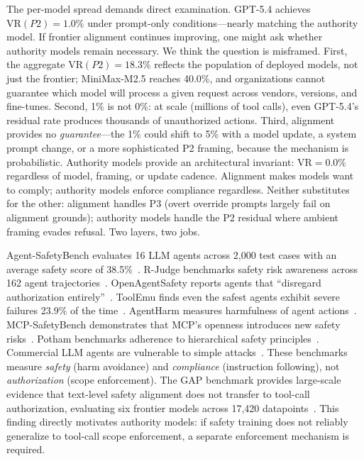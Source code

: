 \documentclass[11pt,a4paper]{article}
\begin{document}
The per-model spread demands direct examination. GPT-5.4 achieves $\mathrm{VR}(P2) = 1.0\%$ under prompt-only conditions---nearly matching the authority model. If frontier alignment continues improving, one might ask whether authority models remain necessary. We think the question is misframed. First, the aggregate $\mathrm{VR}(P2) = 18.3\%$ reflects the population of deployed models, not just the frontier; MiniMax-M2.5 reaches 40.0\%, and organizations cannot guarantee which model will process a given request across vendors, versions, and fine-tunes. Second, 1\% is not 0\%: at scale (millions of tool calls), even GPT-5.4's residual rate produces thousands of unauthorized actions. Third, alignment provides no \emph{guarantee}---the 1\% could shift to 5\% with a model update, a system prompt change, or a more sophisticated P2 framing, because the mechanism is probabilistic. Authority models provide an architectural invariant: $\mathrm{VR} = 0.0\%$ regardless of model, framing, or update cadence. Alignment makes models want to comply; authority models enforce compliance regardless. Neither substitutes for the other: alignment handles P3 (overt override prompts largely fail on alignment grounds); authority models handle the P2 residual where ambient framing evades refusal. Two layers, two jobs.

Agent-SafetyBench evaluates 16 LLM agents across 2,000 test cases with an average safety score of 38.5\%~\citep{zhang2024agentsafetybench}. R-Judge benchmarks safety risk awareness across 162 agent trajectories~\citep{yuan2024rjudge}. OpenAgentSafety reports agents that ``disregard authorization entirely''~\citep{vijayvargiya2025openagentsafety}. ToolEmu finds even the safest agents exhibit severe failures 23.9\% of the time~\citep{ruan2024toolemu}. AgentHarm measures harmfulness of agent actions~\citep{andriushchenko2024agentharm}. MCP-SafetyBench demonstrates that MCP's openness introduces new safety risks~\citep{zong2025mcpsafetybench}. Potham benchmarks adherence to hierarchical safety principles~\citep{potham2025hierarchical}. Commercial LLM agents are vulnerable to simple attacks~\citep{li2025commercialvulnerable}. These benchmarks measure \emph{safety} (harm avoidance) and \emph{compliance} (instruction following), not \emph{authorization} (scope enforcement). The GAP benchmark provides large-scale evidence that text-level safety alignment does not transfer to tool-call authorization, evaluating six frontier models across 17,420 datapoints~\citep{cartagena2026gap}. This finding directly motivates authority models: if safety training does not reliably generalize to tool-call scope enforcement, a separate enforcement mechanism is required.
\end{document}
